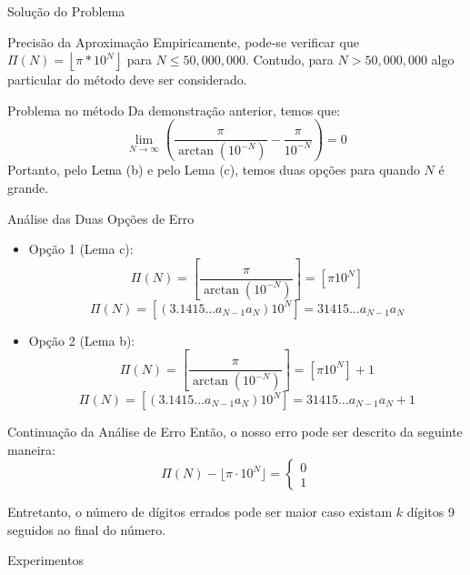 \documentclass{beamer}
\begin{document}
\begin{frame}[plain]
    \centering
    \vfill
    {\Huge {}Solução do Problema}
    \vfill
\end{frame}

\begin{frame}{Precisão da Aproximação}
  Empiricamente, pode-se verificar que $\Pi(N) = \left\lfloor\pi*10^N\right\rfloor$ para $N \le 50,000,000$. Contudo, para $N > 50,000,000$ algo particular do método deve ser considerado.
\end{frame}

\begin{frame}{Problema no método}
    Da demonstração anterior, temos que:
  $$
  \lim_{N\to\infty}\left(\frac{\pi}{\arctan(10^{-N})}-\frac{\pi}{10^{-N}}\right)=0
  $$
  Portanto, pelo Lema (b) e pelo Lema (c), temos duas opções para quando $N$ é grande.
\end{frame}

\begin{frame}{Análise das Duas Opções de Erro}
  \begin{itemize}
    \item Opção 1 (Lema c): 
    $$\Pi(N) = \left [ \frac{\pi}{\arctan{(10^{-N})}}\right] = [\pi 10^N]$$
    $$\Pi(N) = [(3.1415\dots a_{N-1} a_{N})10^N]=31415\dots a_{N-1}a_N$$
    \item Opção 2 (Lema b): 
    $$\Pi(N) = \left [ \frac{\pi}{\arctan{(10^{-N})}}\right] = [\pi 10^N]+1$$
    $$\Pi(N) =[(3.1415\dots a_{N-1} a_{N})10^N]=31415\dots a_{N-1}a_N+1$$
  \end{itemize}
\end{frame}

\begin{frame}{Continuação da Análise de Erro}
  Então, o nosso erro pode ser descrito da seguinte maneira:
    \begin{equation*}
        \Pi(N) - \lfloor \pi \cdot 10^N \rfloor = \left\{
        \begin{array}{c}
        0 \\
        1
        \end{array}
        \right.
    \end{equation*}

Entretanto, o número de dígitos errados pode ser maior caso existam $k$ dígitos 9 seguidos ao final do número.
\end{frame}

\begin{frame}[plain]
    \centering
    \vfill
    {\Huge {}Experimentos}
    \vfill
\end{frame}
\end{document}

